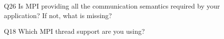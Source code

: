 \begin{description}%
\item{Q26} Is MPI providing all the communication semantics required by your application? If not, what is missing?%
\item{Q18} Which MPI thread support are you using?%
\end{description}%
